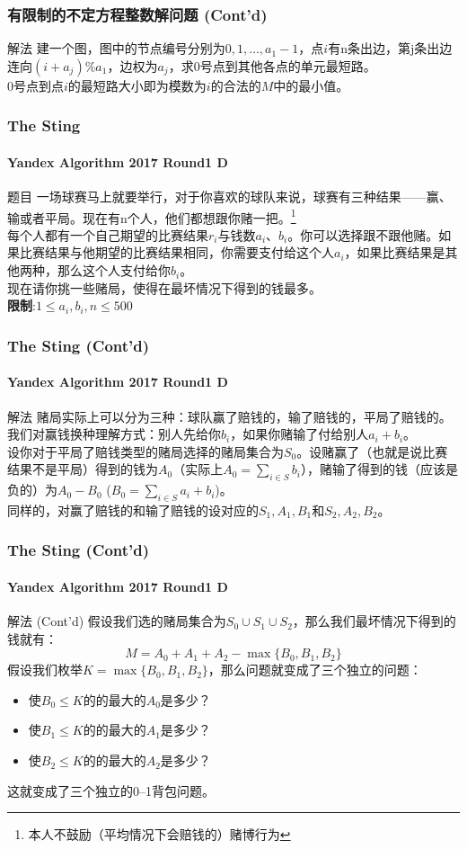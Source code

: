 \documentclass[hyperref={unicode=true}]{beamer}
\begin{document}
\begin{frame}[fragile]\frametitle{有限制的不定方程整数解问题 (Cont'd)}
  \begin{exampleblock}{解法}
    建一个图，图中的节点编号分别为$0,1,\ldots,a_1-1$，点$i$有n条出边，第j条出边连向$(i+a_j)\%a_1$，边权为$a_j$，求$0$号点到其他各点的单元最短路。\\
    $0$号点到点$i$的最短路大小即为模数为$i$的合法的$M$中的最小值。
  \end{exampleblock}
\end{frame}
\begin{frame}\frametitle{The Sting}
  \framesubtitle{Yandex Algorithm 2017 Round1 D}
  \begin{block}{题目}
    一场球赛马上就要举行，对于你喜欢的球队来说，球赛有三种结果——赢、输或者平局。现在有n个人，他们都想跟你赌一把。\protect\footnote{本人不鼓励（平均情况下会赔钱的）赌博行为}\\
    每个人都有一个自己期望的比赛结果$r_i$与钱数$a_i$、$b_i$。你可以选择跟不跟他赌。如果比赛结果与他期望的比赛结果相同，你需要支付给这个人$a_i$，如果比赛结果是其他两种，那么这个人支付给你$b_i$。\\
    现在请你挑一些赌局，使得在最坏情况下得到的钱最多。\\
    {\bf 限制}:$1 \leq a_i, b_i, n \leq500$
  \end{block}
\end{frame}
\begin{frame}\frametitle{The Sting (Cont'd)}
  \framesubtitle{Yandex Algorithm 2017 Round1 D}
  \begin{exampleblock}{解法}
    赌局实际上可以分为三种：球队赢了赔钱的，输了赔钱的，平局了赔钱的。\\
    我们对赢钱换种理解方式：别人先给你$b_i$，如果你赌输了付给别人$a_i+b_i$。\\
    设你对于平局了赔钱类型的赌局选择的赌局集合为$S_0$。设赌赢了（也就是说比赛结果不是平局）得到的钱为$A_0$（实际上$A_0=\sum_{i\in S}b_i$），赌输了得到的钱（应该是负的）为$A_0-B_0$ ($B_0=\sum_{i\in S}a_i+b_i$)。\\
    同样的，对赢了赔钱的和输了赔钱的设对应的$S_1,A_1,B_1$和$S_2,A_2,B_2$。
  \end{exampleblock}
\end{frame}
\begin{frame}\frametitle{The Sting (Cont'd)}
  \framesubtitle{Yandex Algorithm 2017 Round1 D}
  \begin{exampleblock}{解法 (Cont'd)}
    假设我们选的赌局集合为$S_0 \cup S_1 \cup S_2$，那么我们最坏情况下得到的钱就有：
    \[M = A_0+A_1+A_2-\max{\{B_0,B_1,B_2\}}\]
    假设我们枚举$K=\max{\{B_0,B_1,B_2\}}$，那么问题就变成了三个独立的问题：
    \begin{itemize}
    \item 使$B_0\leq K$的的最大的$A_0$是多少？
    \item 使$B_1\leq K$的的最大的$A_1$是多少？
    \item 使$B_2\leq K$的的最大的$A_2$是多少？
    \end{itemize}
    这就变成了三个独立的0--1背包问题。
  \end{exampleblock}
\end{frame}
\end{document}
